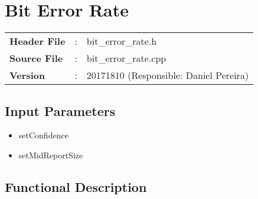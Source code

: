 \clearpage

\section{Bit Error Rate}

\begin{tcolorbox}	
\begin{tabular}{p{2.75cm} p{0.2cm} p{10.5cm}} 	
\textbf{Header File}   &:& bit\_error\_rate.h \\
\textbf{Source File}   &:& bit\_error\_rate.cpp \\
\textbf{Version}       &:& 20171810 (Responsible: Daniel Pereira)
\end{tabular}
\end{tcolorbox}

\subsection*{Input Parameters}

\begin{multicols}{2}
	\begin{itemize}
		\item setConfidence
		\item setMidReportSize
	\end{itemize}
\end{multicols}

\subsection*{Functional Description}\label{bercalc}

